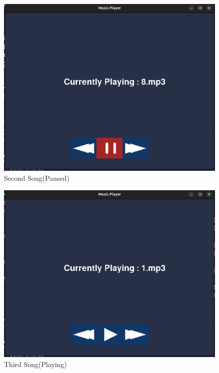 \documentclass[journal,12pt,twocolumn]{IEEEtran}
\begin{document}
\begin{figure}[h!]
        \includegraphics[scale = 0.25]{figs/img2}
        \caption{Second Song(Paused)}
        \label{fig:2}
\end{figure}

\begin{figure}[h!]
       \includegraphics[scale = 0.25]{figs/img3}
        \caption{Third Song(Playing)}
        \label{fig:3}
\end{figure}
\end{document}
